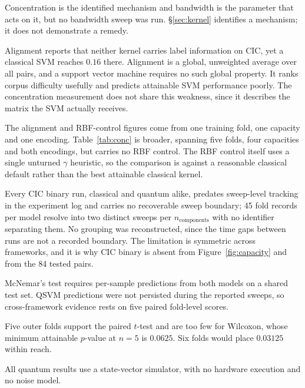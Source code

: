 \documentclass[11pt]{article}
\newcommand{\nc}{\ensuremath{n_{\mathrm{components}}}}
\begin{document}
\begin{description}[leftmargin=1.2em,style=nextline]
\item[Bandwidth is untested on CIC] Concentration is the identified mechanism and
bandwidth is the parameter that acts on it, but no bandwidth sweep was run.
§\ref{sec:kernel} identifies a mechanism; it does not demonstrate a remedy.
\item[Alignment is a weak predictor] Alignment reports that neither kernel carries
label information on CIC, yet a classical SVM reaches $0.16$ there. Alignment is a
global, unweighted average over all pairs, and a support vector machine requires
no such global property. It ranks corpus difficulty usefully and predicts
attainable SVM performance poorly. The concentration measurement does not share
this weakness, since it describes the matrix the SVM actually receives.
\item[Scope of the kernel measurement] The alignment and RBF-control figures come
from one training fold, one capacity and one encoding. Table~\ref{tab:conc} is
broader, spanning five folds, four capacities and both encodings, but carries no
RBF control. The RBF control itself uses a single unturned $\gamma$ heuristic, so
the comparison is against a reasonable classical default rather than the best
attainable classical kernel.
\item[One configuration is not separable] Every CIC binary run, classical and
quantum alike, predates sweep-level tracking in the experiment log and carries no
recoverable sweep boundary; 45 fold records per model resolve into two distinct
sweeps per \nc{} with no identifier separating them. No grouping was
reconstructed, since the time gaps between runs are not a recorded boundary. The
limitation is symmetric across frameworks, and it is why CIC binary is absent
from Figure~\ref{fig:capacity} and from the 84 tested pairs.
\item[No sample-level test between frameworks] McNemar's test requires per-sample
predictions from both models on a shared test set. QSVM predictions were not
persisted during the reported sweeps, so cross-framework evidence rests on five
paired fold-level scores.
\item[Fold count] Five outer folds support the paired $t$-test and are too few for
Wilcoxon, whose minimum attainable $p$-value at $n=5$ is $0.0625$. Six folds would
place $0.03125$ within reach.
\item[Simulator only] All quantum results use a state-vector simulator, with no
hardware execution and no noise model.
\end{description}
\end{document}
